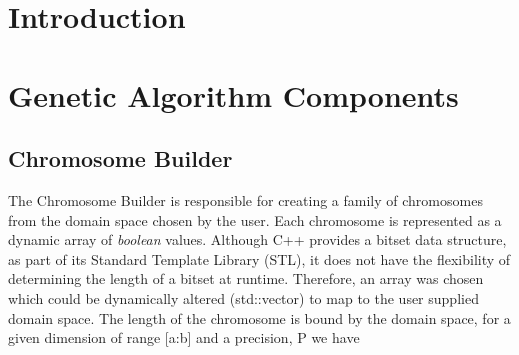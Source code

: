 \documentclass[aps,prl,preprint,groupedaddress,showkeys, nobibnotes]{revtex4-1}
\begin{document}
\maketitle

\section{\label{Intro}Introduction}

\subsection{}
\subsubsection{}

\section{Genetic Algorithm Components}
\subsection{Chromosome Builder}
The Chromosome Builder is responsible for creating a family of chromosomes from the domain space chosen by the user.  Each chromosome is represented as a dynamic array of \textit{boolean} values.  Although C++ provides a bitset data structure, as part of its Standard Template Library (STL), it does not have the flexibility of determining the length of a bitset at runtime.  Therefore, an array was chosen which could be dynamically altered (std::vector) to map to the user supplied domain space.  The length of the chromosome is bound by the domain space, for a given dimension of range [a:b] and a precision, P we have 
\end{document}
